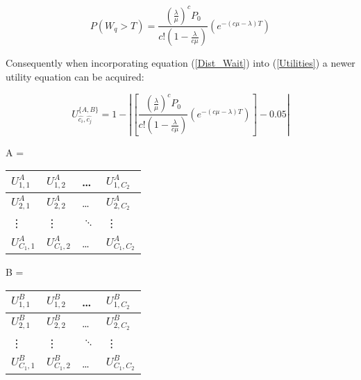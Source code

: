 \documentclass{article}
\begin{document}
\begin{equation}\label{Dist_Wait}
    P(W_q > T) = \frac{(\frac{\lambda}{\mu})^c P_0}{c!(1-\frac{\lambda}{c \mu})} (e^{-(c \mu - \lambda)T})
\end{equation}

Consequently when incorporating equation (\ref{Dist_Wait}) into (\ref{Utilities}) a newer utility equation can be acquired:
 
\begin{equation}\label{Utilities2}
    U_{\hat{c_i}, \hat{c_j}} ^ {\{A, B\}} = 1 - \left| \left[ \frac{(\frac{\lambda}{\mu})^c P_0}{c!(1-\frac{\lambda}{c \mu})} \left( e^{-(c \mu - \lambda)T} \right) \right] - 0.05 \right|
\end{equation}

\begin{table}[h]
    \centering
    \begin{minipage}{.5\linewidth}
        A = 
        \begin{tabular}{|l|l|l|l|}
            \hline
            $U_{1,1}^A$ & $U_{1,2}^A$ & \dots & $U_{1,C_2}^A$ \\ \hline
            $U_{2,1}^A$ & $U_{2,2}^A$ & \dots & $U_{2,C_2}^A$ \\ \hline
            \vdots & \vdots & $\ddots$ & \vdots \\ \hline
            $U_{C_1,1}^A$ & $U_{C_1,2}^A$ & \dots & $U_{C_1,C_2}^A$ \\ \hline
        \end{tabular}
    \end{minipage}%
    \begin{minipage}{.5\linewidth}
        B = 
        \begin{tabular}{|l|l|l|l|}
            \hline
            $U_{1,1}^B$ & $U_{1,2}^B$ & \dots & $U_{1,C_2}^B$ \\ \hline
            $U_{2,1}^B$ & $U_{2,2}^B$ & \dots & $U_{2,C_2}^B$ \\ \hline
            \vdots & \vdots & $\ddots$ & \vdots \\ \hline
            $U_{C_1,1}^B$ & $U_{C_1,2}^B$ & \dots & $U_{C_1,C_2}^B$ \\ \hline
        \end{tabular}
    \end{minipage}
\end{table}  





\end{document}
